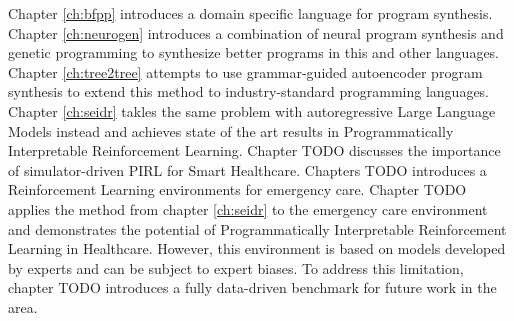 Chapter \ref{ch:bfpp} introduces a domain specific language for program synthesis. 
Chapter \ref{ch:neurogen} introduces a combination of neural program synthesis and genetic programming to synthesize better programs in this and other languages.
Chapter \ref{ch:tree2tree} attempts to use grammar-guided autoencoder program synthesis to extend this method to industry-standard programming languages.
Chapter \ref{ch:seidr} takles the same problem with autoregressive Large Language Models instead and achieves state of the art results in Programmatically Interpretable Reinforcement Learning.
Chapter TODO discusses the importance of simulator-driven PIRL for Smart Healthcare.
Chapters TODO introduces a Reinforcement Learning environments for  emergency care.
Chapter TODO applies the method from chapter \ref{ch:seidr} to the emergency care environment and demonstrates the potential of Programmatically Interpretable Reinforcement Learning in Healthcare.
However, this environment is based on models developed by experts and can be subject to expert biases.
To address this limitation, chapter TODO introduces a fully data-driven benchmark for future work in the area.